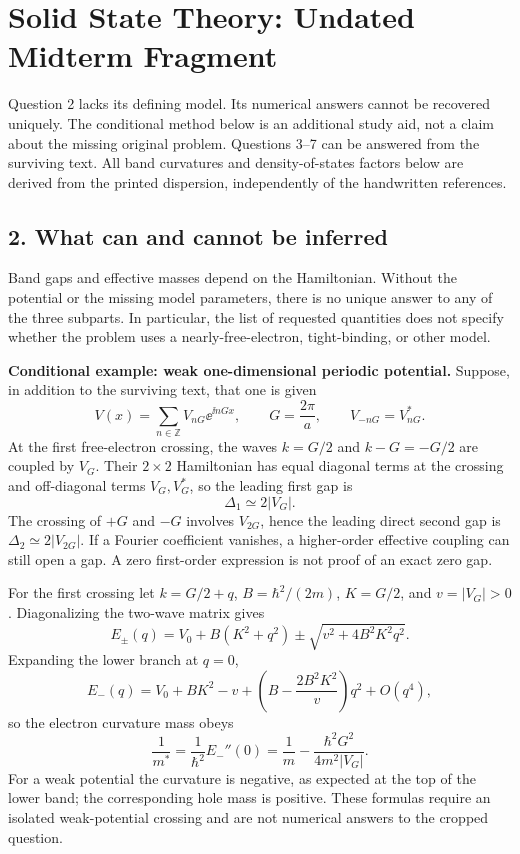 \chapter{Solid State Theory: Undated Midterm Fragment}
\label{s:theory-undated-midterm-fragment}
\begin{sourceNote}
Question 2 lacks its defining model. Its numerical answers cannot be recovered uniquely. The conditional method below is an additional study aid, not a claim about the missing original problem. Questions 3--7 can be answered from the surviving text. All band curvatures and density-of-states factors below are derived from the printed dispersion, independently of the handwritten references.
\end{sourceNote}

\section*{2. What can and cannot be inferred}
Band gaps and effective masses depend on the Hamiltonian. Without the potential or the missing model parameters, there is no unique answer to any of the three subparts. In particular, the list of requested quantities does not specify whether the problem uses a nearly-free-electron, tight-binding, or other model.

\textbf{Conditional example: weak one-dimensional periodic potential.}
Suppose, in addition to the surviving text, that one is given
\[
V(x)=\sum_{n\in\mathbb Z}V_{nG}\ee^{\ii nGx},\qquad G=\frac{2\pi}{a},
\qquad V_{-nG}=V_{nG}^*.
\]
At the first free-electron crossing, the waves $k=G/2$ and $k-G=-G/2$ are coupled by $V_G$. Their $2\times2$ Hamiltonian has equal diagonal terms at the crossing and off-diagonal terms $V_G,V_G^*$, so the leading first gap is
\[
\Delta_1\simeq2|V_G|.
\]
The crossing of $+G$ and $-G$ involves $V_{2G}$, hence the leading direct second gap is $\Delta_2\simeq2|V_{2G}|$. If a Fourier coefficient vanishes, a higher-order effective coupling can still open a gap. A zero first-order expression is not proof of an exact zero gap.

For the first crossing let $k=G/2+q$, $B=\hbar^2/(2m)$, $K=G/2$, and $v=|V_G|>0$. Diagonalizing the two-wave matrix gives
\[
E_\pm(q)=V_0+B(K^2+q^2)\pm\sqrt{v^2+4B^2K^2q^2}.
\]
Expanding the lower branch at $q=0$,
\[
E_-(q)=V_0+BK^2-v+
\left(B-\frac{2B^2K^2}{v}\right)q^2+O(q^4),
\]
so the electron curvature mass obeys
\[
\boxed{\frac1{m^*}=\frac1{\hbar^2}E_-''(0)
=\frac1m-\frac{\hbar^2G^2}{4m^2|V_G|}.}
\]
For a weak potential the curvature is negative, as expected at the top of the lower band; the corresponding hole mass is positive. These formulas require an isolated weak-potential crossing and are not numerical answers to the cropped question.

